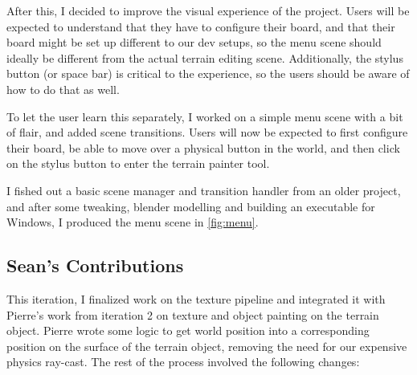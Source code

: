 After this, I decided to improve the visual experience of the project. Users will be expected to understand that they have to configure their board, and that their board might be set up different to our dev setups, so the menu scene should ideally be different from the actual terrain editing scene. Additionally, the stylus button (or space bar) is critical to the experience, so the users should be aware of how to do that as well.

To let the user learn this separately, I worked on a simple menu scene with a bit of flair, and added scene transitions. Users will now be expected to first configure their board, be able to move over a physical button in the world, and then click on the stylus button to enter the terrain painter tool.

I fished out a basic scene manager and transition handler from an older project, and after some tweaking, blender modelling and building an executable for Windows, I produced the menu scene in \autoref{fig:menu}.

\subsection{Sean's Contributions}

This iteration, I finalized work on the texture pipeline and integrated it with Pierre’s work from iteration 2 on texture and object painting on the terrain object. Pierre wrote some logic to get world position into a corresponding position on the surface of the terrain object, removing the need for our expensive physics ray-cast. The rest of the process involved the following changes:

